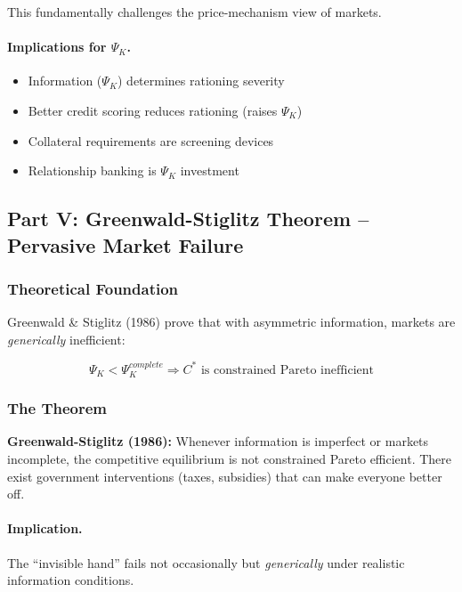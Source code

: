 This fundamentally challenges the price-mechanism view of markets.

\paragraph{Implications for $\Psi_K$.}
\begin{itemize}
    \item Information ($\Psi_K$) determines rationing severity
    \item Better credit scoring reduces rationing (raises $\Psi_K$)
    \item Collateral requirements are screening devices
    \item Relationship banking is $\Psi_K$ investment
\end{itemize}

\subsection{Part V: Greenwald-Stiglitz Theorem – Pervasive Market Failure}

\subsubsection{Theoretical Foundation}

Greenwald \& Stiglitz (1986) prove that with asymmetric information, 
markets are \textit{generically} inefficient:

\begin{equation}
\boxed{
\Psi_K < \Psi_K^{complete} \Rightarrow C^* \text{ is constrained Pareto inefficient}
}
\label{eq:gs-theorem}
\end{equation}

\subsubsection{The Theorem}

\textbf{Greenwald-Stiglitz (1986):} Whenever information is imperfect or markets 
incomplete, the competitive equilibrium is not constrained Pareto efficient. 
There exist government interventions (taxes, subsidies) that can make everyone 
better off.

\paragraph{Implication.}
The ``invisible hand'' fails not occasionally but \textit{generically} under 
realistic information conditions.

